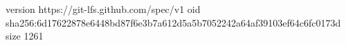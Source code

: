 version https://git-lfs.github.com/spec/v1
oid sha256:6d17622878e6448bd87f6e3b7a612d5a5b7052242a64af39103ef64c6fc0173d
size 1261
